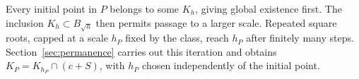 Every initial point in $P$ belongs to some $K_h$, giving global
existence first. The inclusion $K_h\subset B_{\sqrt h}$ then permits
passage to a larger scale. Repeated square roots, capped at a scale
$h_P$ fixed by the class, reach $h_P$ after finitely many steps.
Section~\ref{sec:permanence} carries out this iteration and obtains
$K_P=K_{h_P}\cap(c+S)$, with $h_P$ chosen independently of the initial
point.
